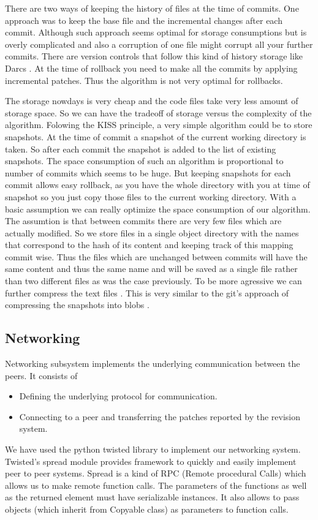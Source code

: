 \documentclass[12pt]{article}
\begin{document}
There are two ways of keeping the history of files at the time of
commits. One approach was to keep the base file and the incremental changes
after each commit. Although such approach seems optimal for storage
consumptions but is overly complicated and also a corruption of one file might
corrupt all your further commits. There are version controls that follow this
kind of history storage like Darcs \cite{darcs}. At the time of rollback you
need to make all the commits by applying incremental patches. Thus the
algorithm is not very optimal for rollbacks.

The storage nowdays is very cheap and the code files take very less amount of
storage space. So we can have the tradeoff of storage versus the complexity of
the algorithm.  Folowing the KISS \cite{KISS} principle, a very simple
algorithm could be to store snapshots. At the time of commit a snapshot of the
current working directory is taken. So after each commit the snapshot is added
to the list of existing snapshots.  The space consumption of such an algorithm
is proportional to number of commits which seems to be huge. But keeping
snapshots for each commit allows easy rollback, as you have the whole
directory with you at time of snapshot so you just copy those files to the
current working directory. With a basic assumption we can really optimize the
space consumption of our algorithm. The assumtion is that between commits
there are very few files which are actually modified. So we store files in a
single object directory with the names that correspond to the hash of its
content and keeping track of this mapping commit wise. Thus the files which
are unchanged between commits will have the same content and thus the same
name and will be saved as a single file rather than two different files as was
the case previously. To be more agressive we can further compress the text
files . This is very similar to the git's approach of compressing the
snapshots into blobs \cite{parable}.

\subsection{Networking}
Networking subsystem implements the underlying communication between the
peers. It consists of
\begin{itemize}
\item Defining the underlying protocol for communication.
\item Connecting to a peer and transferring the patches reported by the
  revision system.
\end{itemize}
We have used the python twisted library to implement our networking
system. Twisted's spread module provides framework to quickly and easily
implement peer to peer systems. Spread is a kind of RPC (Remote procedural
Calls) which allows us to make remote function calls. The parameters of the
functions as well as the returned element must have serializable instances. It
also allows to pass objects (which inherit from Copyable class) as parameters
to function calls.
\end{document}
